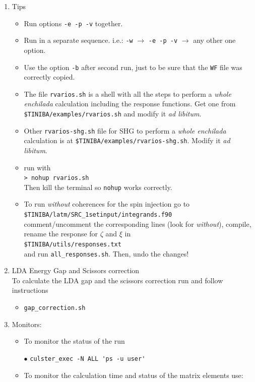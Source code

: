 \documentclass[12pt]{article}
\numberwithin{equation}{section}
\begin{document}
\begin{enumerate}
\item Tips
\begin{itemize}
\item Run  options \verb=-e -p -v= together.
\item Run in a separate sequence. i.e.:
  \verb=-w= $\to$   \verb=-e -p -v= $\to$   any other one option.
\item Use the option \verb=-b= after second run, just to be sure that
  the \verb=WF= file was correctly copied. 
\item The file \verb=rvarios.sh= is a shell with all the steps to
  perform a {\it whole enchilada} calculation including the response
  functions. Get one from \verb=$TINIBA/examples/rvarios.sh= and
  modify it {\it ad libitum}.
\item Other \verb=rvarios-shg.sh= file for SHG to
  perform a {\it whole enchilada} calculation is at
 \verb=$TINIBA/examples/rvarios-shg.sh=.
  Modify it {\it ad libitum}.
\item run with\\ \verb=> nohup rvarios.sh=\\
Then kill the terminal so
  \verb=nohup= works correctly.
\item To run {\it without} coherences for the spin injection go to\\ 
\verb=$TINIBA/latm/SRC_1setinput/integrands.f90=\\
comment/uncomment the corresponding lines (look for {\it without}),
compile, rename the response for $\zeta$ and $\xi$ in\\
 \verb=$TINIBA/utils/responses.txt=\\
and run \verb=all_responses.sh=. Then, undo the changes!  
\end{itemize}

\item LDA Energy Gap and Scissors correction\\
To calculate the LDA gap and the scissors correction run and follow instructions
\begin{itemize}
\item \verb=gap_correction.sh=
\end{itemize}
\item Monitors:
\begin{itemize}
\item To monitor the status of the run

$\bullet$ \verb=culster_exec -N ALL 'ps -u user'=

\item To monitor the calculation time and status of the matrix
  elements use:


\end{itemize}
\end{enumerate}
\end{document}
